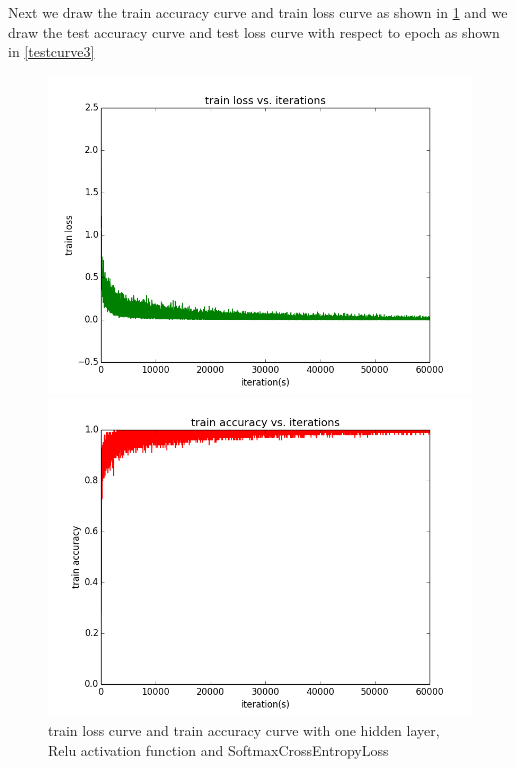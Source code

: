 \documentclass{elegantbook}
\begin{document}
Next we draw the train accuracy curve and train loss curve as shown in \ref{traincurve3} and we draw the test accuracy curve and test loss curve with respect to epoch as shown in \ref{testcurve3}
\begin{figure}[!ht]
	\centering
	\begin{minipage}[t]{0.45\textwidth}
		\centering
		\includegraphics[width=\textwidth]{trainloss1rs}
	\end{minipage}
	\begin{minipage}[t]{0.45\textwidth}
		\centering
		\includegraphics[width=\textwidth]{trainacc1rs}
	\end{minipage}
	\caption{\label{traincurve3}train loss curve and train accuracy curve with one hidden layer, Relu activation function and SoftmaxCrossEntropyLoss}
\end{figure}
\end{document}
